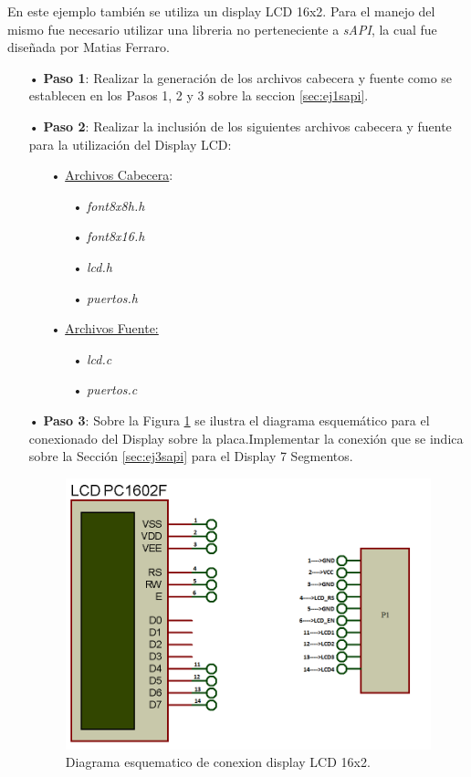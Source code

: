 \documentclass[12pt,letterpaper]{article}
\begin{document}
En este ejemplo también se utiliza un display LCD 16x2. Para el manejo del mismo fue necesario utilizar una libreria no perteneciente a \textit{sAPI}, la cual fue diseñada por Matias Ferraro.
\begin{enumerate}
\item[•]\textbf{Paso 1}: Realizar la generación de los archivos cabecera y fuente como se establecen en los Pasos 1, 2 y 3 sobre la seccion \ref{sec:ej1sapi}.
\item[•]\textbf{Paso 2}: Realizar la inclusión de los siguientes archivos cabecera y fuente para la utilización del Display LCD:
\begin{enumerate}
\item[•]\underline{Archivos Cabecera}:
\begin{enumerate}
\item[•]\textit{font8x8h.h}
\item[•]\textit{font8x16.h}
\item[•]\textit{lcd.h}
\item[•]\textit{puertos.h}
\end{enumerate}
\item[•]\underline{Archivos Fuente:}
\begin{enumerate}
\item[•]\textit{lcd.c}
\item[•]\textit{puertos.c}
\end{enumerate}
\end{enumerate}

\item[•]\textbf{Paso 3}: Sobre la Figura \ref{Fig31} se ilustra el diagrama esquemático para el conexionado del Display sobre la placa.Implementar la conexión que se indica sobre la Sección \ref{sec:ej3sapi} para el Display 7 Segmentos.


\begin{figure}[H]
\centering
\includegraphics[width=12 cm]{figuras/lcd16x2.png}
\caption{Diagrama esquematico de conexion display LCD 16x2.}
\label{Fig31}
\end{figure}



\end{enumerate}
\end{document}
